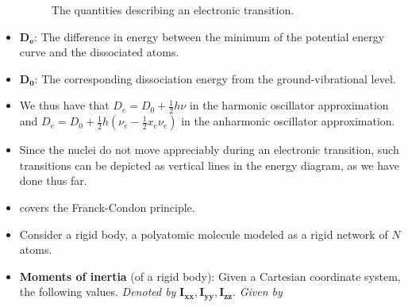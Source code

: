 \documentclass[../notes.tex]{subfiles}
\begin{document}
\begin{itemize}
\begin{figure}[h!]
        \caption{The quantities describing an electronic transition.}
        \label{fig:electronicQuantities}
    \end{figure}
    \item $\bm{D_e}$: The difference in energy between the minimum of the potential energy curve and the dissociated atoms.
    \item $\bm{D_0}$: The corresponding dissociation energy from the ground-vibrational level.
    \item We thus have that $D_e=D_0+\frac{1}{2}h\nu$ in the harmonic oscillator approximation and $D_e=D_0+\frac{1}{2}h(\nu_e-\frac{1}{2}x_e\nu_e)$ in the anharmonic oscillator approximation.
    \item Since the nuclei do not move appreciably during an electronic transition, such transitions can be depicted as vertical lines in the energy diagram, as we have done thus far.
    \item \textcite{bib:McQuarrieSimon} covers the Franck-Condon principle.
    \item Consider a rigid body, a polyatomic molecule modeled as a rigid network of $N$ atoms.
    \item \textbf{Moments of inertia} (of a rigid body): Given a Cartesian coordinate system, the following values. \emph{Denoted by} $\bm{I_{xx}},\bm{I_{yy}},\bm{I_{zz}}$. \emph{Given by}
    \begingroup
    \allowdisplaybreaks
    \begin{align*}

\end{align*}
\end{itemize}
\end{document}
